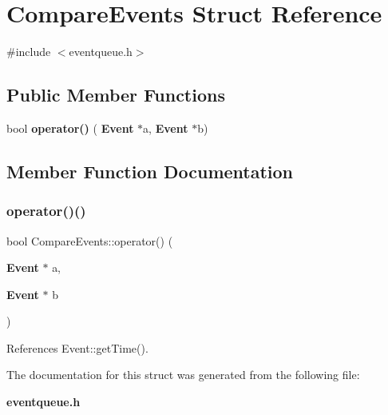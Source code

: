 \section{Compare\+Events Struct Reference}
\label{structCompareEvents}


{\ttfamily \#include $<$eventqueue.\+h$>$}

\subsection*{Public Member Functions}
\begin{DoxyCompactItemize}
\item 
bool \textbf{ operator()} (\textbf{ Event} $\ast$a, \textbf{ Event} $\ast$b)
\end{DoxyCompactItemize}


\subsection{Member Function Documentation}
\mbox{\label{structCompareEvents_a93dc14f11abb42296dd871fa42ec6149}} 
\subsubsection{operator()()}
{\footnotesize\ttfamily bool Compare\+Events\+::operator() (\begin{DoxyParamCaption}\item[{\textbf{ Event} $\ast$}]{a,  }\item[{\textbf{ Event} $\ast$}]{b }\end{DoxyParamCaption})\hspace{0.3cm}{\ttfamily [inline]}}



References Event\+::get\+Time().



The documentation for this struct was generated from the following file\+:\begin{DoxyCompactItemize}
\item 
\textbf{ eventqueue.\+h}\end{DoxyCompactItemize}
